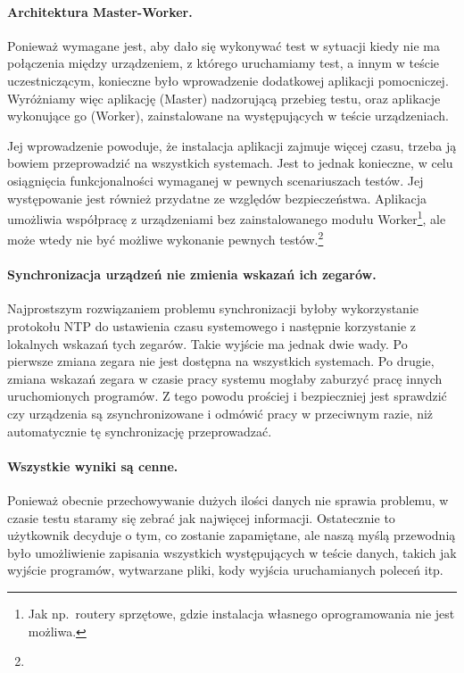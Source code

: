 \documentclass[00-praca-magisterska.tex]{subfiles}
\begin{document}
\paragraph{Architektura Master-Worker.} Ponieważ wymagane jest, aby dało się
wykonywać test w sytuacji kiedy nie ma połączenia między urządzeniem, z którego
uruchamiamy test, a innym w teście uczestniczącym, konieczne było wprowadzenie
dodatkowej aplikacji pomocniczej. Wyróżniamy więc aplikację (Master) nadzorującą
przebieg testu, oraz aplikacje wykonujące go (Worker), zainstalowane na
występujących w teście urządzeniach.

Jej wprowadzenie powoduje, że instalacja aplikacji zajmuje więcej czasu, trzeba
ją bowiem przeprowadzić na wszystkich systemach. Jest to jednak konieczne, w
celu osiągnięcia funkcjonalności wymaganej w pewnych scenariuszach testów. Jej
występowanie jest również przydatne ze względów bezpieczeństwa. Aplikacja
umożliwia współpracę z urządzeniami bez zainstalowanego modułu
Worker\footnote{Jak np.~routery sprzętowe, gdzie instalacja własnego
oprogramowania nie jest możliwa.}, ale może wtedy nie być możliwe wykonanie
pewnych testów.\footnote{}

\paragraph{Synchronizacja urządzeń nie zmienia wskazań ich zegarów.}
Najprostszym rozwiązaniem problemu synchronizacji byłoby wykorzystanie protokołu
NTP do ustawienia czasu systemowego i następnie korzystanie z lokalnych wskazań
tych zegarów. Takie wyjście ma jednak dwie wady. Po pierwsze zmiana zegara nie
jest dostępna na wszystkich systemach. Po drugie, zmiana wskazań zegara w czasie
pracy systemu mogłaby zaburzyć pracę innych uruchomionych programów. Z tego
powodu prościej i bezpieczniej jest sprawdzić czy urządzenia są zsynchronizowane
i odmówić pracy w przeciwnym razie, niż automatycznie tę synchronizację
przeprowadzać.


\paragraph{Wszystkie wyniki są cenne.} Ponieważ obecnie przechowywanie dużych
ilości danych nie sprawia problemu, w czasie testu staramy się zebrać jak
najwięcej informacji. Ostatecznie to użytkownik decyduje o tym, co zostanie
zapamiętane, ale naszą myślą przewodnią było umożliwienie zapisania wszystkich
występujących w teście danych, takich jak wyjście programów, wytwarzane pliki,
kody wyjścia uruchamianych poleceń itp.
\end{document}
